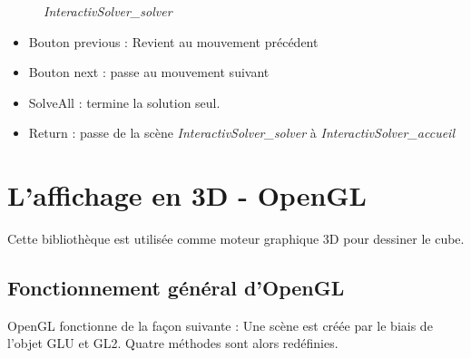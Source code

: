 \begin{figure}[H]
\begin{center}
\end{center}
	\caption{ \textit{InteractivSolver\_solver}}
\end{figure}

\begin{itemize}
    \item Bouton previous : Revient au mouvement précédent
    \item Bouton next : passe au mouvement suivant 
    \item SolveAll : termine la solution seul.
    \item Return : passe de la scène \textit{InteractivSolver\_solver} à \textit{InteractivSolver\_accueil}
\end{itemize}

\section{L'affichage en 3D - OpenGL}

Cette bibliothèque est utilisée comme moteur graphique 3D pour dessiner le cube.

\subsection{Fonctionnement général d'OpenGL}
OpenGL fonctionne de la façon suivante :
	Une scène est créée par le biais de l’objet GLU et GL2.
	Quatre méthodes sont alors redéfinies.

